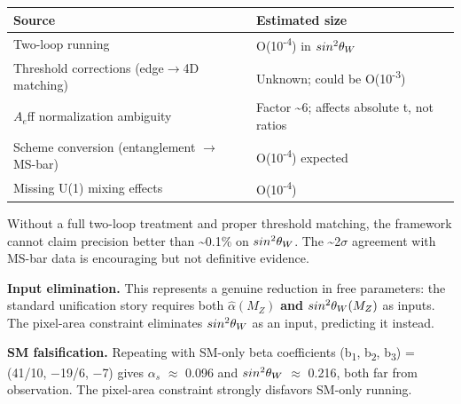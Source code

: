 \documentclass[11pt,a4paper]{article}
\theoremstyle{remark}
\begin{document}
{\def\LTcaptype{none} %
\begin{longtable}[]{@{}
  >{\raggedright\arraybackslash}p{}
  >{\raggedright\arraybackslash}p{}@{}}
\toprule\noalign{}
\begin{minipage}[b]{\linewidth}\raggedright
Source
\end{minipage} & \begin{minipage}[b]{\linewidth}\raggedright
Estimated size
\end{minipage} \\
\midrule\noalign{}
\endhead
\bottomrule\noalign{}
\endlastfoot
Two-loop running & O(10\textsuperscript{-4}) in \(sin\textsuperscript{2}\ensuremath{\theta}_W\) \\
Threshold corrections (edge\ensuremath{\to}4D matching) & Unknown; could be O(10\textsuperscript{-3}) \\
\(A_e\)ff normalization ambiguity & Factor \textasciitilde6; affects absolute t, not ratios \\
Scheme conversion (entanglement \ensuremath{\to} MS-bar) & O(10\textsuperscript{-4}) expected \\
Missing U(1) mixing effects & O(10\textsuperscript{-4}) \\
\end{longtable}
}

Without a full two-loop treatment and proper threshold matching, the
framework cannot claim precision better than \textasciitilde0.1\% on \(sin\textsuperscript{2}\ensuremath{\theta}_W\). The \textasciitilde2\ensuremath{\sigma}
agreement with MS-bar data is encouraging but not definitive evidence.

\textbf{Input elimination.} This represents a genuine reduction in free parameters:
the standard unification story requires both \(\hat{\alpha}(M_Z)\) \textbf{and}
\(sin\textsuperscript{2}\ensuremath{\theta}_W(M_Z)\) as inputs. The pixel-area constraint eliminates \(sin\textsuperscript{2}\ensuremath{\theta}_W\) as an
input, predicting it instead.

\textbf{SM falsification.} Repeating with SM-only beta coefficients
(b\textsubscript{1}, b\textsubscript{2}, b\textsubscript{3}) = (41/10, \ensuremath{-}19/6, \ensuremath{-}7) gives \(\ensuremath{\alpha}_s\) \ensuremath{\approx} 0.096 and \(sin\textsuperscript{2}\ensuremath{\theta}_W\) \ensuremath{\approx} 0.216,
both far from observation. The pixel-area constraint strongly disfavors
SM-only running.
\end{document}
